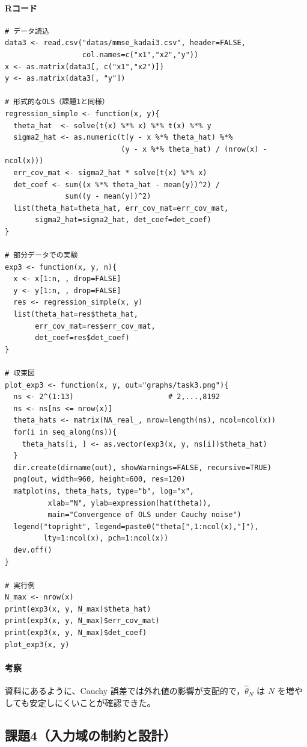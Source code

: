 \paragraph{Rコード}
\begin{verbatim}
# データ読込
data3 <- read.csv("datas/mmse_kadai3.csv", header=FALSE,
                  col.names=c("x1","x2","y"))
x <- as.matrix(data3[, c("x1","x2")])
y <- as.matrix(data3[, "y"])

# 形式的なOLS（課題1と同様）
regression_simple <- function(x, y){
  theta_hat  <- solve(t(x) %*% x) %*% t(x) %*% y
  sigma2_hat <- as.numeric(t(y - x %*% theta_hat) %*%
                           (y - x %*% theta_hat) / (nrow(x) - ncol(x)))
  err_cov_mat <- sigma2_hat * solve(t(x) %*% x)
  det_coef <- sum((x %*% theta_hat - mean(y))^2) /
              sum((y - mean(y))^2)
  list(theta_hat=theta_hat, err_cov_mat=err_cov_mat,
       sigma2_hat=sigma2_hat, det_coef=det_coef)
}

# 部分データでの実験
exp3 <- function(x, y, n){
  x <- x[1:n, , drop=FALSE]
  y <- y[1:n, , drop=FALSE]
  res <- regression_simple(x, y)
  list(theta_hat=res$theta_hat,
       err_cov_mat=res$err_cov_mat,
       det_coef=res$det_coef)
}

# 収束図
plot_exp3 <- function(x, y, out="graphs/task3.png"){
  ns <- 2^(1:13)                      # 2,...,8192
  ns <- ns[ns <= nrow(x)]
  theta_hats <- matrix(NA_real_, nrow=length(ns), ncol=ncol(x))
  for(i in seq_along(ns)){
    theta_hats[i, ] <- as.vector(exp3(x, y, ns[i])$theta_hat)
  }
  dir.create(dirname(out), showWarnings=FALSE, recursive=TRUE)
  png(out, width=960, height=600, res=120)
  matplot(ns, theta_hats, type="b", log="x",
          xlab="N", ylab=expression(hat(theta)),
          main="Convergence of OLS under Cauchy noise")
  legend("topright", legend=paste0("theta[",1:ncol(x),"]"),
         lty=1:ncol(x), pch=1:ncol(x))
  dev.off()
}

# 実行例
N_max <- nrow(x)
print(exp3(x, y, N_max)$theta_hat)
print(exp3(x, y, N_max)$err_cov_mat)
print(exp3(x, y, N_max)$det_coef)
plot_exp3(x, y)
\end{verbatim}

\paragraph{考察}
資料にあるように、Cauchy 誤差では外れ値の影響が支配的で，$\hat\theta_N$ は $N$ を増やしても安定しにくいことが確認できた。


\subsection{課題4（入力域の制約と設計）}

